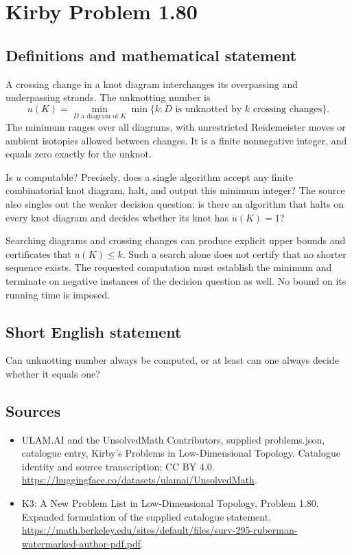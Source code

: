 \documentclass[11pt,a4paper]{article}
\begin{document}
\section*{Kirby Problem 1.80}\label{statement}

\subsection{Definitions and mathematical statement}
A crossing change in a knot diagram interchanges its overpassing and
underpassing strands. The unknotting number is
\[
u(K)=\min_{D\text{ a diagram of }K}
\min\{k:D\text{ is unknotted by }k\text{ crossing changes}\}.
\]
The minimum ranges over all diagrams, with unrestricted Reidemeister moves or
ambient isotopies allowed between changes. It is a finite nonnegative integer,
and equals zero exactly for the unknot.

Is $u$ computable? Precisely, does a single algorithm accept any finite
combinatorial knot diagram, halt, and output this minimum integer? The source
also singles out the weaker decision question: is there an algorithm that halts
on every knot diagram and decides whether its knot has $u(K)=1$?

Searching diagrams and crossing changes can produce explicit upper bounds and
certificates that $u(K)\leq k$. Such a search alone does not certify that no
shorter sequence exists. The requested computation must establish the minimum
and terminate on negative instances of the decision question as well. No bound
on its running time is imposed.
\subsection{Short English statement}
Can unknotting number always be computed, or at least can one always decide whether it equals one?
\subsection{Sources}
\begin{itemize}
\item[S1] ULAM.AI and the UnsolvedMath Contributors, supplied problems.json, catalogue entry, Kirby's Problems in Low-Dimensional Topology. Catalogue identity and source transcription; CC BY 4.0.
\url{https://huggingface.co/datasets/ulamai/UnsolvedMath}.
\item[S2] K3: A New Problem List in Low-Dimensional Topology, Problem 1.80. Expanded formulation of the supplied catalogue statement.
\url{https://math.berkeley.edu/sites/default/files/surv-295-ruberman-watermarked-author-pdf.pdf}.
\end{itemize}
\end{document}
